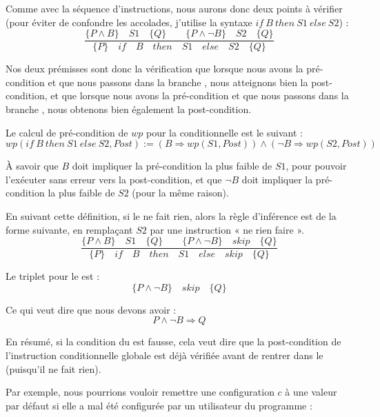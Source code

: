 Comme avec la séquence d'instructions, nous aurons donc deux points à vérifier
(pour éviter de confondre les accolades, j'utilise la syntaxe 
$if\ B\ then\ S1\ else\ S2$) :
$$\dfrac{\{P \wedge B\}\quad S1\quad \{Q\} \quad \quad \{P \wedge \neg B\}\quad S2\quad \{Q\}}{\{P\}\quad if\quad B\quad then\quad S1\quad else\quad S2 \quad \{Q\}}$$



Nos deux prémisses sont donc la vérification que lorsque nous avons la 
pré-condition et que nous passons dans la branche , nous atteignons bien la
post-condition, et que lorsque nous avons la pré-condition et que nous passons
dans la branche , nous obtenons bien également la post-condition.



Le calcul de pré-condition de $wp$ pour la conditionnelle est le suivant :
$$wp(if\ B\ then\ S1\ else\ S2 , Post) := (B \Rightarrow wp(S1, Post)) \wedge (\neg B \Rightarrow wp(S2, Post))$$


À savoir que $B$ doit impliquer la pré-condition la plus faible de $S1$, pour 
pouvoir l'exécuter sans erreur vers la post-condition, et que $\neg B$ doit 
impliquer la pré-condition la plus faible de $S2$ (pour la même raison).





En suivant cette définition, si le  ne fait rien, alors la règle
d'inférence est de la forme suivante, en remplaçant $S2$ par une instruction
« ne rien faire ».
$$\dfrac{\{P \wedge B\}\quad S1\quad \{Q\} \quad \quad \{P \wedge \neg B\}\quad skip\quad \{Q\}}{\{P\}\quad if\quad B\quad then\quad S1\quad else\quad skip \quad \{Q\}}$$



Le triplet pour le  est :
$$\{P \wedge \neg B\}\quad skip\quad \{Q\}$$



Ce qui veut dire que nous devons avoir :
$$P \wedge \neg B \Rightarrow Q$$



En résumé, si la condition du  est fausse, cela veut dire que la 
post-condition de l'instruction conditionnelle globale est déjà vérifiée avant de 
rentrer dans le  (puisqu'il ne fait rien).



Par exemple, nous pourrions vouloir remettre une configuration $c$ à une valeur 
par défaut si elle a mal été configurée par un utilisateur du programme :



